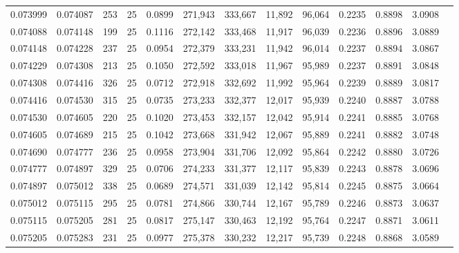 \begin{tabular}{rrrrrrrrrrrrr}
0.073999 & 0.074087 &   253 &  25 &                                     0.0899 & 271,943 & 333,667 &  11,892 &  96,064 & 0.2235 & 0.8898 & 3.0908 \\
0.074088 & 0.074148 &   199 &  25 &                                     0.1116 & 272,142 & 333,468 &  11,917 &  96,039 & 0.2236 & 0.8896 & 3.0889 \\
0.074148 & 0.074228 &   237 &  25 &                                     0.0954 & 272,379 & 333,231 &  11,942 &  96,014 & 0.2237 & 0.8894 & 3.0867 \\
0.074229 & 0.074308 &   213 &  25 &                                     0.1050 & 272,592 & 333,018 &  11,967 &  95,989 & 0.2237 & 0.8891 & 3.0848 \\
0.074308 & 0.074416 &   326 &  25 &                                     0.0712 & 272,918 & 332,692 &  11,992 &  95,964 & 0.2239 & 0.8889 & 3.0817 \\
0.074416 & 0.074530 &   315 &  25 &                                     0.0735 & 273,233 & 332,377 &  12,017 &  95,939 & 0.2240 & 0.8887 & 3.0788 \\
0.074530 & 0.074605 &   220 &  25 &                                     0.1020 & 273,453 & 332,157 &  12,042 &  95,914 & 0.2241 & 0.8885 & 3.0768 \\
0.074605 & 0.074689 &   215 &  25 &                                     0.1042 & 273,668 & 331,942 &  12,067 &  95,889 & 0.2241 & 0.8882 & 3.0748 \\
0.074690 & 0.074777 &   236 &  25 &                                     0.0958 & 273,904 & 331,706 &  12,092 &  95,864 & 0.2242 & 0.8880 & 3.0726 \\
0.074777 & 0.074897 &   329 &  25 &                                     0.0706 & 274,233 & 331,377 &  12,117 &  95,839 & 0.2243 & 0.8878 & 3.0696 \\
0.074897 & 0.075012 &   338 &  25 &                                     0.0689 & 274,571 & 331,039 &  12,142 &  95,814 & 0.2245 & 0.8875 & 3.0664 \\
0.075012 & 0.075115 &   295 &  25 &                                     0.0781 & 274,866 & 330,744 &  12,167 &  95,789 & 0.2246 & 0.8873 & 3.0637 \\
0.075115 & 0.075205 &   281 &  25 &                                     0.0817 & 275,147 & 330,463 &  12,192 &  95,764 & 0.2247 & 0.8871 & 3.0611 \\
0.075205 & 0.075283 &   231 &  25 &                                     0.0977 & 275,378 & 330,232 &  12,217 &  95,739 & 0.2248 & 0.8868 & 3.0589 \\

\end{tabular}
